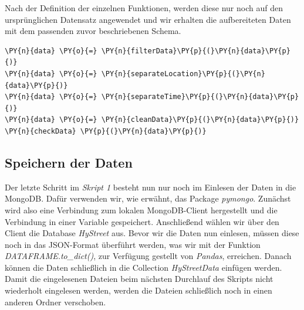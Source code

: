Nach der Definition der einzelnen Funktionen, werden diese nur noch auf den ursprünglichen Datensatz angewendet und wir erhalten die aufbereiteten Daten mit dem passenden zuvor beschriebenen Schema.

\bigbreak
\begin{tcolorbox}[breakable, size=fbox, boxrule=1pt, pad at break*=1mm,colback=cellbackground, colframe=cellborder]
\begin{Verbatim}[commandchars=\\\{\}]
\PY{n}{data} \PY{o}{=} \PY{n}{filterData}\PY{p}{(}\PY{n}{data}\PY{p}{)}
\PY{n}{data} \PY{o}{=} \PY{n}{separateLocation}\PY{p}{(}\PY{n}{data}\PY{p}{)}
\PY{n}{data} \PY{o}{=} \PY{n}{separateTime}\PY{p}{(}\PY{n}{data}\PY{p}{)}
\PY{n}{data} \PY{o}{=} \PY{n}{cleanData}\PY{p}{(}\PY{n}{data}\PY{p}{)}
\PY{n}{checkData} \PY{p}{(}\PY{n}{data}\PY{p}{)}
\end{Verbatim}
\end{tcolorbox}
\bigbreak

\subsection{Speichern der Daten}
Der letzte Schritt im \emph{Skript 1} besteht nun nur noch im Einlesen der Daten in die MongoDB. Dafür verwenden wir, wie erwähnt, das Package \emph{pymongo}. Zunächst wird also eine Verbindung zum lokalen MongoDB-Client hergestellt und die Verbindung in einer Variable gespeichert. Anschließend wählen wir über den Client die Database \emph{HyStreet} aus. Bevor wir die Daten nun einlesen, müssen diese noch in das JSON-Format überführt werden, was wir mit der Funktion \emph{DATAFRAME.to\_dict()}, zur Verfügung gestellt von \emph{Pandas}, erreichen. Danach können die Daten schließlich in die Collection \emph{HyStreetData} einfügen werden. 
Damit die eingelesenen Dateien beim nächsten Durchlauf des Skripts nicht wiederholt eingelesen werden, werden die Dateien schließlich noch in einen anderen Ordner verschoben.

